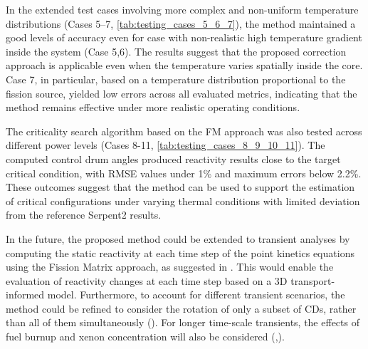 \documentclass[preprint,review,12pt]{elsarticle}
\begin{document}
In the extended test cases involving more complex and non-uniform temperature distributions (Cases 5--7, \cref{tab:testing_cases_5_6_7}), the method maintained a good levels of accuracy even for case with non-realistic high temperature gradient inside the system (Case 5,6). The results suggest that the proposed correction approach is applicable even when the temperature varies spatially inside the core. Case 7, in particular, based on a temperature distribution proportional to the fission source, yielded low errors across all evaluated metrics, indicating that the method remains effective under more realistic operating conditions.

The criticality search algorithm based on the FM approach was also tested across different power levels (Cases 8-11, \cref{tab:testing_cases_8_9_10_11}). The computed control drum angles produced reactivity results close to the target critical condition, with RMSE values under 1\% and maximum errors below 2.2\%. These outcomes suggest that the method can be used to support the estimation of critical configurations under varying thermal conditions with limited deviation from the reference Serpent2 results. 

In the future, the proposed method could be extended to transient analyses by computing the static reactivity at each time step of the point kinetics equations using the Fission Matrix approach, as suggested in \cite{Dalinger2024}. This would enable the evaluation of reactivity changes at each time step based on a 3D transport-informed model. Furthermore, to account for different transient scenarios, the method could be refined to consider the rotation of only a subset of CDs, rather than all of them simultaneously (\cite{Mascolino2022}). For longer time-scale transients, the effects of fuel burnup and xenon concentration will also be considered (\cite{Roskoff2018},\cite{Pungerčič}).




 

\end{document}
